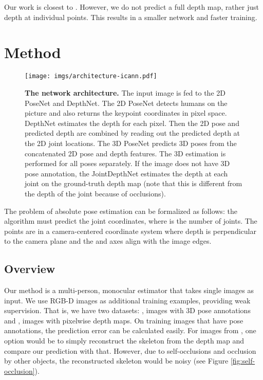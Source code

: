 \documentclass[runningheads]{llncs}
\begin{document}
Our work is closest to \cite{cai2018weakhand}. However, we do not predict a full depth map, rather just depth at individual points. This results in a smaller network and faster training.

\section{Method}

\begin{figure*}[t]
\begin{center}
\texttt{[image: imgs/architecture-icann.pdf]}
\end{center}
\caption{\textbf{The network architecture.} The input image is fed to the 2D PoseNet and DepthNet. The 2D PoseNet detects humans on the picture and also returns the keypoint coordinates in pixel space. DepthNet estimates the depth for each pixel. Then the 2D pose and predicted depth are combined by reading out the predicted depth at the 2D joint locations. The 3D PoseNet predicts 3D poses from the concatenated 2D pose and depth features. The 3D estimation is performed for all poses separately. If the image does not have 3D pose annotation, the JointDepthNet estimates the depth at each joint on the ground-truth depth map (note that this is different from the depth of the joint because of occlusions).}
\label{fig:architecture}
\end{figure*}

The problem of absolute pose estimation can be formalized as follows: the algorithm must predict the  joint coordinates, where  is the number of joints. The  points are in a camera-centered coordinate system where depth is perpendicular to the camera plane and the  and  axes align with the image edges.

\subsection{Overview} \label{sec:overview}
Our method is a multi-person, monocular estimator that takes single images as input. We use RGB\nobreakdash-D images as additional training examples, providing weak supervision. That is, we have two datasets: , images with 3D pose annotations and , images with pixelwise depth maps. On training images that have pose annotations, the prediction error can be calculated easily. For images from , one option would be to simply reconstruct the skeleton from the depth map and compare our prediction with that. However, due to self-occlusions and occlusion by other objects, the reconstructed skeleton would be noisy (see Figure \ref{fig:self-occlusion}). 
\end{document}
